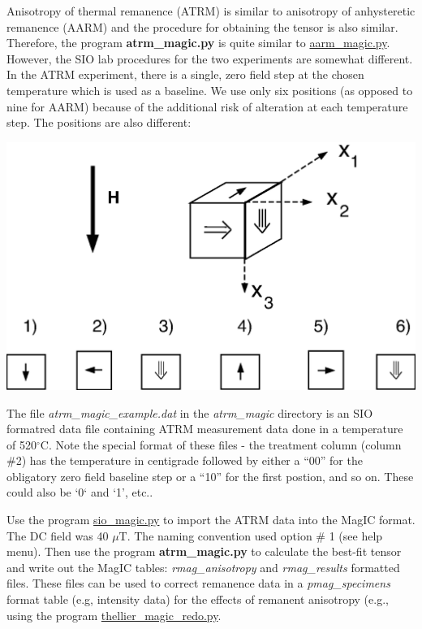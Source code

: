 \documentclass[11pt]{book}
\begin{document}
{{Anisotropy of thermal  remanence (ATRM) is similar to anisotropy of anhysteretic remanence (AARM) and the procedure for obtaining the tensor is also similar.  Therefore, the program {\bf atrm\_magic.py} is quite similar to \href{#aarm_magic.py}{aarm\_magic.py}.  However, the SIO lab procedures for the two experiments are somewhat different.  In the ATRM experiment, there is a single, zero field step at the chosen temperature which is used as a baseline.  We use only six positions (as opposed to nine for AARM) because of the additional risk of alteration at each temperature step.  The positions are also different:

\includegraphics[width=15cm]{EPSfiles/atrm_meas.eps}

The file {\it atrm\_magic\_example.dat} in the {\it atrm\_magic} directory is an SIO formatred data file containing ATRM measurement data done in a temperature of 520$^{\circ}$C.   Note the special format of these files - the treatment column (column \#2) has the temperature in centigrade followed by either a ``00'' for the obligatory zero field baseline step or a ``10'' for the first postion, and so on.  These could also be `0` and `1', etc..

Use the program \href{#sio_magic.py}{sio\_magic.py} to import the ATRM data  into the MagIC format.  The DC field was 40 $\mu$T.  The naming convention used option \# 1 (see help menu).
Then use the program {\bf atrm\_magic.py} to calculate the best-fit tensor and write out the MagIC tables: {\it rmag\_anisotropy} and {\it rmag\_results} formatted files.   These files can be used to correct remanence data in a {\it pmag\_specimens} format table (e.g, intensity data) for the effects of remanent anisotropy (e.g., using the program \href{#thellier_magic.py}{thellier\_magic\_redo.py}.

}}
\end{document}
